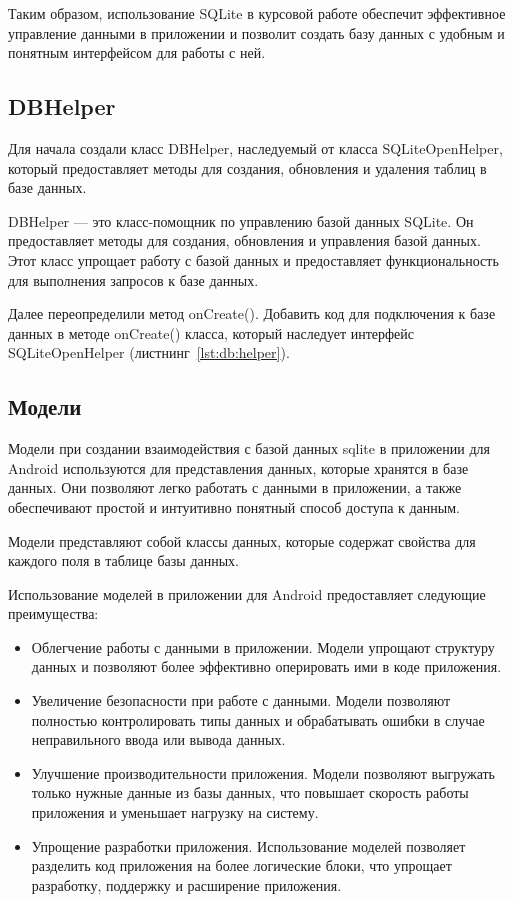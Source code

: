 Таким образом, использование SQLite в курсовой работе обеспечит
эффективное управление данными в приложении и позволит создать
базу данных с удобным и понятным интерфейсом для работы с ней.

\subsection{DBHelper}
Для начала создали класс DBHelper, наследуемый от класса SQLiteOpenHelper,
который предоставляет методы для создания, обновления и удаления
таблиц в базе данных.\par
DBHelper --- это класс-помощник по управлению базой данных SQLite.
Он предоставляет методы для создания, обновления и управления базой данных.
Этот класс упрощает работу с базой данных и предоставляет функциональность
для выполнения запросов к базе данных.\par
Далее переопределили метод onCreate().
Добавить код для подключения к базе данных в методе onCreate() класса,
который наследует интерфейс SQLiteOpenHelper (листнинг~\ref{lst:db:helper}).

\subsection{Модели}
Модели при создании взаимодействия с базой данных sqlite
в приложении для Android используются для представления данных,
которые хранятся в базе данных. Они позволяют легко
работать с данными в приложении, а также обеспечивают простой
и интуитивно понятный способ доступа к данным. \par
Модели представляют собой классы данных,
которые содержат свойства для каждого поля в таблице базы данных.\par
Использование моделей в приложении для Android предоставляет
следующие преимущества:

\begin{itemize}
	\item Облегчение работы с данными в приложении.
		Модели упрощают структуру данных и позволяют более
		эффективно оперировать ими в коде приложения.
	\item Увеличение безопасности при работе с данными.
		Модели позволяют полностью контролировать типы данных
		и обрабатывать ошибки в случае неправильного ввода или вывода данных.
	\item Улучшение производительности приложения.
		Модели позволяют выгружать только нужные данные из базы данных,
		что повышает скорость работы приложения
		и уменьшает нагрузку на систему.
	\item Упрощение разработки приложения.
		Использование моделей позволяет разделить код приложения
		на более логические блоки, что упрощает разработку,
		поддержку и расширение приложения.
\end{itemize}


